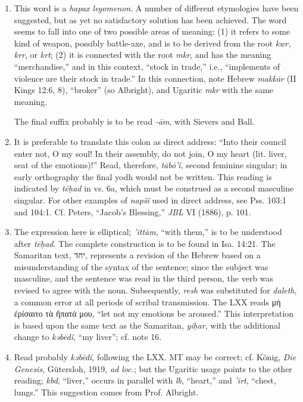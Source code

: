\begin{enumerate}
\item
This word is a \emph{hapax legomenon}. A number of different etymologies have
been suggested, but as yet no satisfactory solution has been achieved. The
word seems to fall into one of two possible areas of meaning: (1) it refers to
some kind of weapon, possibly battle-axe, and is to be derived from the root
\emph{kwr, krr}, or \emph{krt}; (2) it is connected with the root \emph{mkr},
and has the meaning ``merchandise,'' and in this context, ``stock in trade,''
i.e., ``implements of violence are their stock in trade.'' In this connection,
note Hebrew \emph{makkār} (II Kings 12:6, 8), ``broker'' (so Albright), and
Ugaritic \emph{mkr} with the same meaning.

The final suffix probably is to be read \emph{-ām}, with Sievers and Ball.

\item
It is preferable to translate this colon as direct address: ``Into their
council enter not, O my soul! In their assembly, do not join, O my heart
(lit. liver, seat of the emotions)!'' Read, therefore, \emph{tābō'î}, second
feminine singular; in early orthography the final yodh would not be written.
This reading is indicated by \emph{tēḥad} in vs. 6a, which must be construed
as a second masculine singular. For other examples of \emph{napšî} used in
direct address, see Pss. 103:1 and 104:1. Cf. Peters, ``Jacob's Blessing,''
\emph{JBL} VI (1886), p. 101.

\item
The expression here is elliptical; \emph{'ittām}, ``with them,'' is to be
understood after \emph{tēḥad}. The complete construction is to be found in
Isa. 14:21. The Samaritan text, יחד, represents a revision of the Hebrew based
on a misunderstanding of the syntax of the sentence; since the subject was
masculine, and the sentence was read in the third person, the verb was revised
to agree with the noun. Subsequently, \emph{resh} was substituted for
\emph{daleth}, a common error at all periods of scribal transmission. The LXX
reads μὴ ἐρίσαιτο τὰ ἥπατά μου, ``let not my emotions be aroused.'' This
interpretation is based upon the same text as the Samaritan, \emph{yiḥar},
with the additional change to \emph{kəbēdî}, ``my liver''; cf. note 16.

\item
Read probably \emph{kəbēdî}, following the LXX. MT may be correct; cf. König,
\emph{Die Genesis}, Gütersloh, 1919, \emph{ad loc.}; but the Ugaritic usage
points to the other reading; \emph{kbd}, ``liver,'' occurs in parallel with
\emph{lb}, ``heart,'' and \emph{'irt}, ``chest, lungs.'' This suggestion comes
from Prof. Albright.


\end{enumerate}

